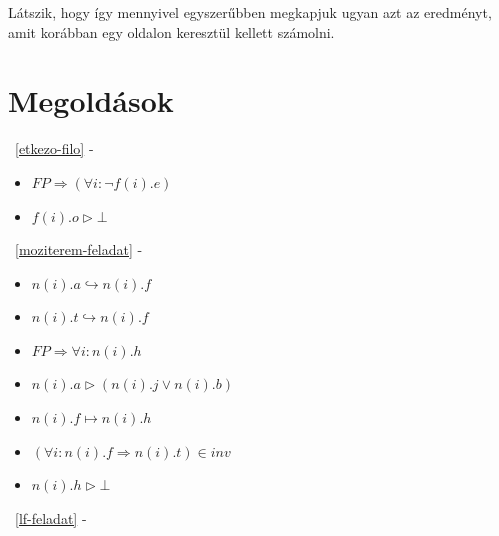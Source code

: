 \documentclass[12pt]{article}
\begin{document}
Látszik, hogy így mennyivel egyszerűbben megkapjuk ugyan azt az eredményt, amit korábban egy oldalon keresztül kellett számolni.


\newpage
\section{Megoldások}
	~\ref{etkezo-filo} - 
	\begin{itemize}
		\item $FP \Rightarrow (\forall i: \neg f(i).e)$
		\item $f(i).o \vartriangleright \bot$
	\end{itemize}
	~\ref{moziterem-feladat} - 
	\begin{itemize}
		\item $n(i).a \hookrightarrow n(i).f $
		\item $n(i).t \hookrightarrow n(i).f$
		\item $FP \Rightarrow \forall i : n(i).h$
		\item $n(i).a \vartriangleright (n(i).j \lor n(i).b)$
		\item $n(i).f \mapsto n(i).h$
		\item $(\forall i: n(i).f \Rightarrow n(i).t) \in inv$
		\item $n(i).h \vartriangleright \bot$
	\end{itemize}
	~\ref{lf-feladat} - 
\end{document}
